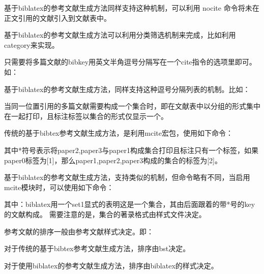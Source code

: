 基于biblatex的参考文献生成方法同样支持这种机制，可以利用 nocite 命令将未在正文引用的文献引入到文献表中。



基于biblatex的参考文献生成方法可以利用分类筛选机制来完成，比如利用category来实现。



只需要将多篇文献的bibkey用英文半角逗号分隔写在一个cite指令的选项里即可。如：

\begin{texlist}
\cite{knuth84,lamport86}
\end{texlist}

基于biblatex的参考文献生成方法，同样支持这种逗号分隔列表的机制。比如：
\begin{texlist}
\cite{bibkey1,bibkey2,bibkey3,bibkey4}
\supercite{bibkey1,bibkey2,bibkey3,bibkey4}
\parencite{bibkey1,bibkey2,bibkey3,bibkey4}
\textcite{bibkey1,bibkey2,bibkey3,bibkey4}
\end{texlist}

当同一位置引用的多篇文献需要构成一个集合时，即在文献表中以分组的形式集中在一起打印，且标注标签以集合的形式仅显示一个。

传统的基于bibtex参考文献生成方法，是利用mcite宏包，使用如下命令：

\begin{texlist}
\cite{paper0,paper1,*paper2,*paper3}
\end{texlist}

其中*符号表示将paper2,paper3与paper1构成集合打印且标注只有一个标签，如果paper0标签为[1]，那么paper1,paper2,paper3构成的集合的标签为[2]。

基于biblatex的参考文献生成方法，支持类似的机制，但命令略有不同，当启用mcite模块时，可以使用如下命令：

\begin{texlist}
\end{texlist}

其中：biblatex用一个set1显式的表明这是一个集合，其由后面跟着的带*号的key的文献构成。
需要注意的是，集合的著录格式由样式文件决定。




参考文献的排序一般由参考文献样式决定。即：

对于传统的基于bibtex参考文献生成方法，排序由bst决定。

对于使用biblatex的参考文献生成方法，排序由biblatex的样式决定。

